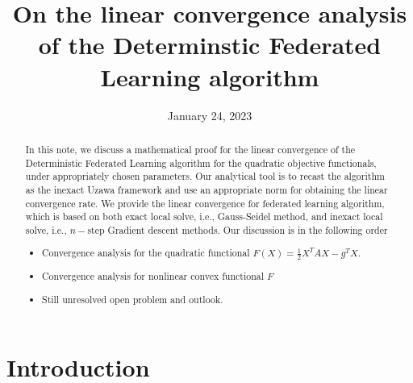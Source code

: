 \documentclass{article}
\title{On the linear convergence analysis of the Determinstic Federated Learning algorithm}
\date{January 24, 2023}
\theoremstyle{definition}
\begin{document}
\maketitle
\begin{abstract}
In this note, we discuss a mathematical proof for the linear convergence of the Deterministic Federated Learning algorithm for the quadratic objective functionals, under appropriately chosen parameters. Our analytical tool is to recast the algorithm as the inexact Uzawa framework and use an appropriate norm for obtaining the linear convergence rate. We provide the linear convergence for federated learning algorithm, which is based on both exact local solve, i.e., Gauss-Seidel method, and inexact local solve, i.e., $n-$step Gradient descent methods. Our discussion is in the following order 
\begin{itemize}
    \item Convergence analysis for the quadratic functional $F(X) = \frac{1}{2} X^T A X - g^T X.$ 
    \item Convergence analysis for nonlinear convex functional $F$ 
    \item Still unresolved open problem and outlook. 
\end{itemize}
\end{abstract}

\tableofcontents 

\section{Introduction}
\end{document}
